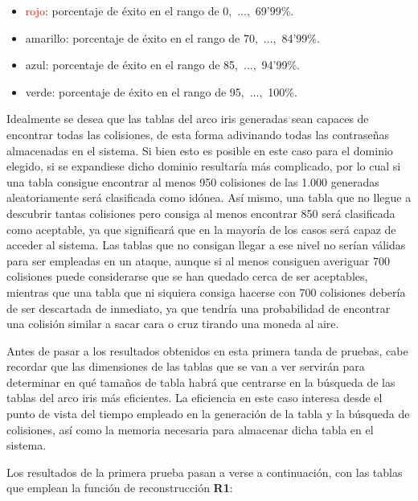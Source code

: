 \documentclass[12pt,spanish,listoffigures,listoftables,listofalgorithms]{tfgetsinf}
\begin{document}
\begin{itemize}

    \item \textcolor{red}{rojo}: porcentaje de éxito en el rango de 0,~$\dots$,~69'99\%.
    
    \item \textcolor{y}{amarillo}: porcentaje de éxito en el rango de 70,~$\dots$,~84'99\%.
    
    \item \textcolor{b}{azul}: porcentaje de éxito en el rango de 85,~$\dots$,~94'99\%.
    
    \item \textcolor{g}{verde}: porcentaje de éxito en el rango de 95,~$\dots$,~100\%.
    
\end{itemize}

Idealmente se desea que las tablas del arco iris generadas sean capaces de encontrar todas las colisiones, de esta forma adivinando todas las contraseñas almacenadas en el sistema. Si bien esto es posible en este caso para el dominio elegido, si se expandiese dicho dominio resultaría más complicado, por lo cual si una tabla consigue encontrar al menos 950 colisiones de las 1.000 generadas aleatoriamente será clasificada como idónea. Así mismo, una tabla que no llegue a descubrir tantas colisiones pero consiga al menos encontrar 850 será clasificada como aceptable, ya que significará que en la mayoría de los casos será capaz de acceder al sistema. Las tablas que no consigan llegar a ese nivel no serían válidas para ser empleadas en un ataque, aunque si al menos consiguen averiguar 700 colisiones puede considerarse que se han quedado cerca de ser aceptables, mientras que una tabla que ni siquiera consiga hacerse con 700 colisiones debería de ser descartada de inmediato, ya que tendría una probabilidad de encontrar una colisión similar a sacar cara o cruz tirando una moneda al aire.

Antes de pasar a los resultados obtenidos en esta primera tanda de pruebas, cabe recordar que las dimensiones de las tablas que se van a ver servirán para determinar en qué tamaños de tabla habrá que centrarse en la búsqueda de las tablas del arco iris más eficientes. La eficiencia en este caso interesa desde el punto de vista del tiempo empleado en la generación de la tabla y la búsqueda de colisiones, así como la memoria necesaria para almacenar dicha tabla en el sistema. 

Los resultados de la primera prueba pasan a verse a continuación, con las tablas que emplean la función de reconstrucción \textbf{R1}:
\end{document}
